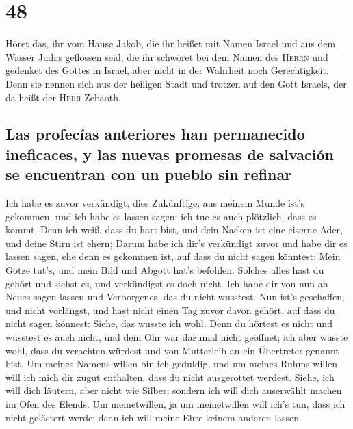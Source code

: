 \hypertarget{section-47}{%
\section{48}\label{section-47}}

 Höret das, ihr vom Hause Jakob, die ihr heißet mit Namen
Israel und aus dem Wasser Judas geflossen seid; die ihr schwöret bei dem
Namen des \textsc{Herrn} und gedenket des Gottes in Israel, aber nicht
in der Wahrheit noch Gerechtigkeit.  Denn sie nennen sich
aus der heiligen Stadt und trotzen auf den Gott Israels, der da heißt
der \textsc{Herr} Zebaoth.

\hypertarget{las-profecuxedas-anteriores-han-permanecido-ineficaces-y-las-nuevas-promesas-de-salvaciuxf3n-se-encuentran-con-un-pueblo-sin-refinar}{%
\subsection{Las profecías anteriores han permanecido ineficaces, y las
nuevas promesas de salvación se encuentran con un pueblo sin
refinar}\label{las-profecuxedas-anteriores-han-permanecido-ineficaces-y-las-nuevas-promesas-de-salvaciuxf3n-se-encuentran-con-un-pueblo-sin-refinar}}

 Ich habe es zuvor verkündigt, dies Zukünftige; aus meinem
Munde ist's gekommen, und ich habe es lassen sagen; ich tue es auch
plötzlich, dass es kommt.  Denn ich weiß, dass du hart
bist, und dein Nacken ist eine eiserne Ader, und deine Stirn ist ehern;
 Darum habe ich dir's verkündigt zuvor und habe dir es
lassen sagen, ehe denn es gekommen ist, auf dass du nicht sagen
könntest: Mein Götze tut's, und mein Bild und Abgott hat's befohlen.
 Solches alles hast du gehört und siehst es, und
verkündigst es doch nicht. Ich habe dir von nun an Neues sagen lassen
und Verborgenes, das du nicht wusstest.  Nun ist's
geschaffen, und nicht vorlängst, und hast nicht einen Tag zuvor davon
gehört, auf dass du nicht sagen könnest: Siehe, das wusste ich wohl.
 Denn du hörtest es nicht und wusstest es auch nicht, und
dein Ohr war dazumal nicht geöffnet; ich aber wusste wohl, dass du
verachten würdest und von Mutterleib an ein Übertreter genannt bist.
 Um meines Namens willen bin ich geduldig, und um meines
Ruhms willen will ich mich dir zugut enthalten, dass du nicht
ausgerottet werdest.  Siehe, ich will dich läutern, aber
nicht wie Silber; sondern ich will dich auserwählt machen im Ofen des
Elends.  Um meinetwillen, ja um meinetwillen will ich's
tun, dass ich nicht gelästert werde; denn ich will meine Ehre keinem
anderen lassen.

